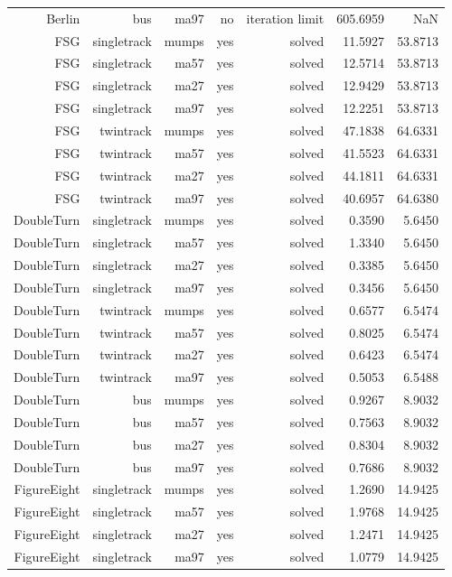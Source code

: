 {\begin{longtable}{|r|r|r|r|r|r|r|}
  Berlin & bus & ma97 & no & iteration limit & 605.6959 & NaN \\
  FSG & singletrack & mumps & yes & solved & 11.5927 & 53.8713 \\
  FSG & singletrack & ma57 & yes & solved & 12.5714 & 53.8713 \\
  FSG & singletrack & ma27 & yes & solved & 12.9429 & 53.8713 \\
  FSG & singletrack & ma97 & yes & solved & 12.2251 & 53.8713 \\
  FSG & twintrack & mumps & yes & solved & 47.1838 & 64.6331 \\
  FSG & twintrack & ma57 & yes & solved & 41.5523 & 64.6331 \\
  FSG & twintrack & ma27 & yes & solved & 44.1811 & 64.6331 \\
  FSG & twintrack & ma97 & yes & solved & 40.6957 & 64.6380 \\
  DoubleTurn & singletrack & mumps & yes & solved & 0.3590 & 5.6450 \\
  DoubleTurn & singletrack & ma57 & yes & solved & 1.3340 & 5.6450 \\
  DoubleTurn & singletrack & ma27 & yes & solved & 0.3385 & 5.6450 \\
  DoubleTurn & singletrack & ma97 & yes & solved & 0.3456 & 5.6450 \\
  DoubleTurn & twintrack & mumps & yes & solved & 0.6577 & 6.5474 \\
  DoubleTurn & twintrack & ma57 & yes & solved & 0.8025 & 6.5474 \\
  DoubleTurn & twintrack & ma27 & yes & solved & 0.6423 & 6.5474 \\
  DoubleTurn & twintrack & ma97 & yes & solved & 0.5053 & 6.5488 \\
  DoubleTurn & bus & mumps & yes & solved & 0.9267 & 8.9032 \\
  DoubleTurn & bus & ma57 & yes & solved & 0.7563 & 8.9032 \\
  DoubleTurn & bus & ma27 & yes & solved & 0.8304 & 8.9032 \\
  DoubleTurn & bus & ma97 & yes & solved & 0.7686 & 8.9032 \\
  FigureEight & singletrack & mumps & yes & solved & 1.2690 & 14.9425 \\
  FigureEight & singletrack & ma57 & yes & solved & 1.9768 & 14.9425 \\
  FigureEight & singletrack & ma27 & yes & solved & 1.2471 & 14.9425 \\
  FigureEight & singletrack & ma97 & yes & solved & 1.0779 & 14.9425 \\

\end{longtable}}
